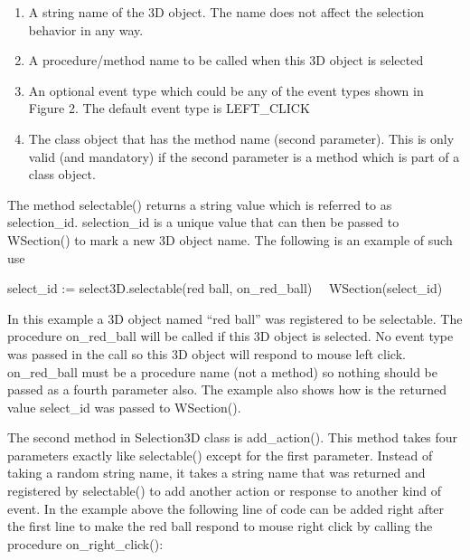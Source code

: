 \documentclass[letterpaper]{article}
\newcommand\liststyleLix{%
\renewcommand\theenumi{\arabic{enumi}}
\renewcommand\theenumii{\arabic{enumii}}
\renewcommand\theenumiii{\arabic{enumiii}}
\renewcommand\theenumiv{\arabic{enumiv}}
\renewcommand\labelenumi{\theenumi.}
\renewcommand\labelenumii{\theenumii.}
\renewcommand\labelenumiii{\theenumiii.}
\renewcommand\labelenumiv{\theenumiv.}
}
\begin{document}
{\bigskip

\liststyleLix
\begin{enumerate}
\item {
A string name of the 3D object. The name does not affect the selection behavior in any way. }
\item {
A procedure/method name to be called when this 3D object is selected}
\item {
An optional event type which could be any of the event types shown in Figure 2. The default event type is
\textsf{LEFT\_CLICK}}
\item {
The class object that has the method name (second parameter). This is only valid (and mandatory) if the second
parameter is a method which is part of a class object.}
\end{enumerate}

\bigskip

{
The method \textsf{selectable()} returns a string value which is referred to as selection\_id. selection\_id is a unique
value that can then be passed to \textsf{WSection()} to mark a new 3D object name. The following is an example of such
use}


\bigskip

{\sffamily
select\_id := select3D.selectable({\textquotedbl}red ball{\textquotedbl}, on\_red\_ball)~~ \newline
WSection(select\_id)}


\bigskip

{
In this example a 3D object named \textsf{{}``red ball''} was registered to be selectable. The procedure
\textsf{on\_red\_ball} will be called if this 3D object is selected. No event type was passed in the call so this 3D
object will respond to mouse left click. \textsf{on\_red\_ball} must be a procedure name (not a method) so nothing
should be passed as a fourth parameter also. The example also shows how is the returned value \textsf{select\_id} was
passed to \textsf{WSection().}}


\bigskip

{
The second method in Selection3D class is \textsf{add\_action()}. This method takes four parameters exactly like
\textsf{selectable()} except for the first parameter. Instead of taking a random string name, it takes a string name
that was returned and registered by \textsf{selectable()} to add another action or response to another kind of event.
In the example above the following line of code can be added right after the first line to make the red ball respond
to mouse right click by calling the procedure \textsf{on\_right\_click():}}


}
\end{document}
